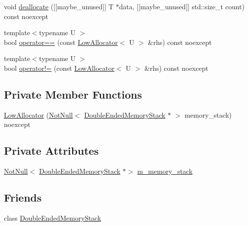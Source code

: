 \begin{DoxyCompactItemize}
\item 
void \mbox{\hyperlink{classmage_1_1_double_ended_memory_stack_1_1_low_allocator_a88f5633e61739a5c4c0bc3b56f7cd792}{deallocate}} (\mbox{[}\mbox{[}maybe\+\_\+unused\mbox{]}\mbox{]} T $\ast$data, \mbox{[}\mbox{[}maybe\+\_\+unused\mbox{]}\mbox{]} std\+::size\+\_\+t count) const noexcept
\item 
{\footnotesize template$<$typename U $>$ }\\bool \mbox{\hyperlink{classmage_1_1_double_ended_memory_stack_1_1_low_allocator_a3f46f2f022d96c4019e7f22670c1f001}{operator==}} (const \mbox{\hyperlink{classmage_1_1_double_ended_memory_stack_1_1_low_allocator}{Low\+Allocator}}$<$ U $>$ \&rhs) const noexcept
\item 
{\footnotesize template$<$typename U $>$ }\\bool \mbox{\hyperlink{classmage_1_1_double_ended_memory_stack_1_1_low_allocator_a8bc70b92cfb631d2d24cc7f30dcb2897}{operator!=}} (const \mbox{\hyperlink{classmage_1_1_double_ended_memory_stack_1_1_low_allocator}{Low\+Allocator}}$<$ U $>$ \&rhs) const noexcept
\end{DoxyCompactItemize}
\subsection*{Private Member Functions}
\begin{DoxyCompactItemize}
\item 
\mbox{\hyperlink{classmage_1_1_double_ended_memory_stack_1_1_low_allocator_a4fa86a3c4e05b229f25c46e1bfa163c4}{Low\+Allocator}} (\mbox{\hyperlink{namespacemage_a8769f9d670d6b585ea306cb1062af94b}{Not\+Null}}$<$ \mbox{\hyperlink{classmage_1_1_double_ended_memory_stack}{Double\+Ended\+Memory\+Stack}} $\ast$ $>$ memory\+\_\+stack) noexcept
\end{DoxyCompactItemize}
\subsection*{Private Attributes}
\begin{DoxyCompactItemize}
\item 
\mbox{\hyperlink{namespacemage_a8769f9d670d6b585ea306cb1062af94b}{Not\+Null}}$<$ \mbox{\hyperlink{classmage_1_1_double_ended_memory_stack}{Double\+Ended\+Memory\+Stack}} $\ast$$>$ \mbox{\hyperlink{classmage_1_1_double_ended_memory_stack_1_1_low_allocator_a2921f1244aec0a0ec5427c446a9b35b4}{m\+\_\+memory\+\_\+stack}}
\end{DoxyCompactItemize}
\subsection*{Friends}
\begin{DoxyCompactItemize}
\item 
class \mbox{\hyperlink{classmage_1_1_double_ended_memory_stack_1_1_low_allocator_a10ae729d55b8c0017057250445835680}{Double\+Ended\+Memory\+Stack}}
\end{DoxyCompactItemize}


